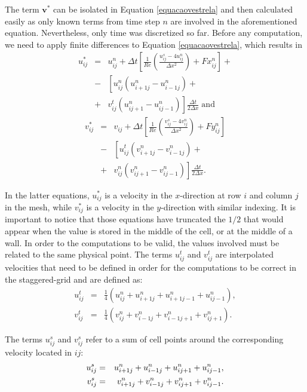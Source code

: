 \documentclass[journal]{IEEEtran}
\begin{document}
The term $\mathbf{v}^*$ can be isolated in Equation \ref{equacaovestrela} and then calculated easily as only known terms from time step $n$ are involved in the aforementioned equation. Nevertheless, only time was discretized so far. Before any computation, we need to apply finite differences to Equation \ref{equacaovestrela}, which results in %
\begin{eqnarray}
u_{ij}^{*}&=&u_{ij}^n+\Delta t\left[\frac{1}{\mathit{Re}}\left(\frac{u_{ij}^s-4u_{ij}^n}{\Delta
x^2}\right)+Fx_{ij}^n\right] + \nonumber \\
&-&\left[u_{ij}^n(u_{i+1j}^n-u_{i-1j}^n)+ \right.\nonumber \\
&+& \left. v_{ij}^t(u_{ij+1}^n-u_{ij-1}^n)\right]\frac{\Delta t}{2\Delta x}\; \textrm{and }\label{step1-3}
\end{eqnarray}
\begin{eqnarray}
v_{ij}^{*}&=&v_{ij}+\Delta t\left[\frac{1}{\mathit{Re}}\left(\frac{v_{ij}^s-4v_{ij}^n}{\Delta
x^2}\right)+Fy_{ij}^n\right] \nonumber \\
&-&\left[u_{ij}^t (v_{i+1j}^n-v_{i-1j}^n)+ \right.\nonumber \\
&+& \left. v_{ij}^n(v_{ij+1}^n-v_{ij-1}^n)\right]\frac{\Delta t}{2\Delta x}.\label{step1-4}
\end{eqnarray}

In the latter equations, $u^*_{ij}$ is a velocity in the $x$-direction at row $i$ and column $j$ in the mesh, while $v^*_{ij}$ is a velocity in the $y$-direction with similar indexing. It is important to notice that those equations have truncated the $1/2$ that would appear when the value is stored in the middle of the cell, or at the middle of a wall. In order to the computations to be valid, the values involved must be related to the same physical point. The terms $u_{ij}^t$ and $v_{ij}^t$ are interpolated velocities that need to be defined in order for the computations to be correct in the staggered-grid and are defined as: \begin{eqnarray}
u_{ij}^t&=&\frac{1}{4}(u_{ij}^n+u_{i+1j}^n+u_{i+1j-1}^n+u_{ij-1}^n) \label{ut},\\ 
v_{ij}^t &=& \frac{1}{4}(v_{ij}^n+v_{i-1j}^n+v_{i-1j+1}^n+v_{ij+1}^n). \label{vt}
\end{eqnarray}

The terms $u^s_{ij}$ and $v^s_{ij}$ refer to a sum of cell points around the corresponding velocity located in $ij$: \begin{eqnarray}
u_{ij}^s &=& \SumFour{u} \label{us}, \\
v_{ij}^s &=& \SumFour{v} \label{vs}.
\end{eqnarray}
\end{document}
